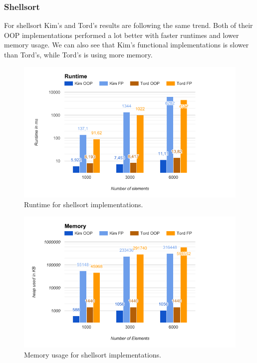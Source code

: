 \documentclass {article}
\begin{document}
\subsubsection{Shellsort}
For shellsort Kim's and Tord's results are following the same trend. Both of their OOP implementations performed a lot better with faster runtimes and lower memory usage. We can also see that Kim's functional implementations is slower than Tord's, while Tord's is using more memory.

\begin{figure}[H]
\includegraphics[width=\textwidth]{shellsort-runtime}

\caption{Runtime for shellsort implementations.}
\label{fig:shellsort-runtime}
\end{figure}

\begin{figure}[H]
\includegraphics[width=\textwidth]{shellsort-memory}

\caption{Memory usage for shellsort implementations.}
\label{fig:shellsort-memory}
\end{figure}
\end{document}
